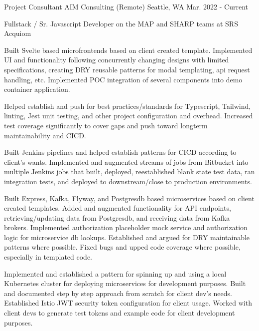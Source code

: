 \begin{cventries}
\cventry
{Project Consultant} %
{AIM Consulting (Remote)} %
{Seattle, WA} %
{Mar. 2022 - Current} %
{
\begin{cvitems}
\item[] {Fullstack / Sr. Javascript Developer on the MAP and SHARP teams at SRS Acquiom}
\item[]
\item {Built Svelte based microfrontends based on client created template. Implemented UI and functionality following concurrently changing designs with limited specifications, creating DRY reusable patterns for modal templating, api request handling, etc. Implemented POC integration of several components into demo container application.}
\item {Helped establish and push for best practices/standards for Typescript, Tailwind, linting, Jest unit testing, and other project configuration and overhead. Increased test coverage significantly to cover gaps and push toward longterm maintainability and CICD.}
\item {Built Jenkins pipelines and helped establish patterns for CICD according to client's wants. Implemented and augmented streams of jobs from Bitbucket into multiple Jenkins jobs that built, deployed, reestablished blank state test data, ran integration tests, and deployed to downstream/close to production environments.}
\item {Built Express, Kafka, Flyway, and Postgresdb based microservices based on client created templates. Added and augmented functionality for API endpoints, retrieving/updating data from Postgresdb, and receiving data from Kafka brokers. Implemented authorization placeholder mock service and authorization logic for microservice db lookups. Established and argued for DRY maintainable patterns where possible. Fixed bugs and upped code coverage where possible, especially in templated code.}
\item {Implemented and established a pattern for spinning up and using a local Kubernetes cluster for deploying microservices for development purposes. Built and documented step by step approach from scratch for client dev's needs. Established Istio JWT security token configuration for client usage. Worked with client devs to generate test tokens and example code for client development purposes.}

\end{cvitems}}
\end{cventries}
